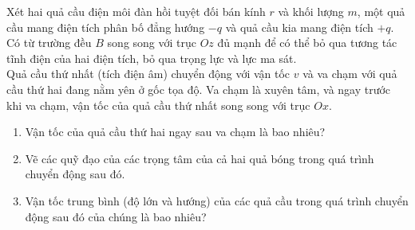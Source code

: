 \begin{vd}[Bi-a từ tính]
 Xét hai quả cầu điện môi đàn hồi tuyệt đối bán kính $r$ và khối lượng $m$, một quả cầu mang điện tích phân bố đẳng hướng $-q$ và quả cầu kia mang điện tích $+q$. Có từ trường đều $B$ song song với trục $Oz$ đủ mạnh để có thể bỏ qua tương tác tĩnh điện của hai điện tích, bỏ qua trọng lực và lực ma sát.
 \\Quả cầu thứ nhất (tích điện âm) chuyển động với vận tốc $v$ và va chạm với quả cầu thứ hai đang nằm yên ở gốc tọa độ. Va chạm là xuyên tâm, và ngay trước khi va chạm, vận tốc của quả cầu thứ nhất song song với trục $Ox$.
 \begin{enumerate}[1)]
     \item Vận tốc của quả cầu thứ hai ngay sau va chạm là bao nhiêu?
     \item Vẽ các quỹ đạo của các trọng tâm của cả hai quả bóng trong quá trình chuyển động sau đó.
     \item Vận tốc trung bình (độ lớn và hướng) của các quả cầu trong quá trình chuyển động sau đó của chúng là bao nhiêu?
 \end{enumerate}
\end{vd}
